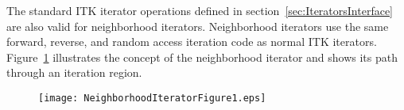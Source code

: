 The standard ITK iterator operations defined in
section~\ref{sec:IteratorsInterface} are also valid for neighborhood iterators.
Neighborhood iterators use the same forward, reverse, and random access
iteration code as normal ITK iterators.
Figure~\ref{fig:WalkingNeighborhoodIterator} illustrates the concept of the
neighborhood iterator and shows its path through an iteration region.

\begin{figure}
\centering
\texttt{[image: NeighborhoodIteratorFigure1.eps]}
\protect\label{fig:WalkingNeighborhoodIterator}
\end{figure}

